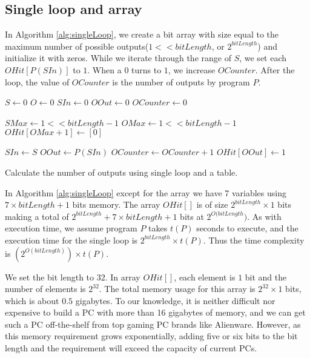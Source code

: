 \subsection{Single loop and array}
In Algorithm \ref{alg:singleLoop}, we create a bit array with size equal to the maximum number of possible outputs($1 << bitLength$, or $2^{bitLength}$) and initialize it with zeros. While we iterate through the range of $S$, we set each $OHit[P(SIn)]$ to $1$. When a $0$ turns to $1$, we increase $OCounter$. After the loop, the value of $OCounter$ is the number of outputs by program $P$. 

\renewcommand{\algorithmiccomment}[1]{// #1}
\begin{algorithm}
\begin{algorithmic}

\STATE $S \leftarrow 0$
\STATE $O \leftarrow 0$
\STATE $SIn \leftarrow 0$
\STATE $OOut \leftarrow 0$
\STATE $OCounter \leftarrow 0$

\STATE $SMax \leftarrow 1 << bitLength - 1$
\STATE $OMax \leftarrow 1 << bitLength - 1$
\STATE $OHit[OMax + 1] \leftarrow [0]$

\STATE $SIn \leftarrow S$ 
\STATE $OOut \leftarrow P(SIn)$ 
\STATE $OCounter \leftarrow OCounter + 1$
\STATE $OHit[OOut] \leftarrow 1$
\ENDIF
\ENDFOR

\end{algorithmic}

\caption[Single loop]{Calculate the number of outputs using single loop and a table.}
\label{alg:singleLoop}
\end{algorithm}

In Algorithm \ref{alg:singleLoop} except for the array we have 7 variables using $7 \times bitLength + 1$ bits memory. The array $OHit[]$ is of size $2^{bitLength} \times 1$ bits making a total of $2^{bitLength} + 7 \times bitLength + 1$ bits at $2^{O(bitLength})$. As with execution time, we assume program $P$ takes $t(P)$ seconds to execute, and the execution time for the single loop is $2^{bitLength} \times t(P)$. Thus the time complexity is $(2^{O(bitLength)}) \times t(P)$.

We set the bit length to $32$. In array $OHit[]$, each element is $1$ bit and the number of elements is $2^{32}$. The total memory usage for this array is $2^{32} \times 1$ bits, which is about $0.5$ gigabytes. To our knowledge, it is neither difficult nor expensive to build a PC with more than 16 gigabytes of memory, and we can get such a PC off-the-shelf from top gaming PC brands like Alienware. However, as this memory requirement grows exponentially, adding five or six bits to the bit length and the requirement will exceed the capacity of current PCs.

